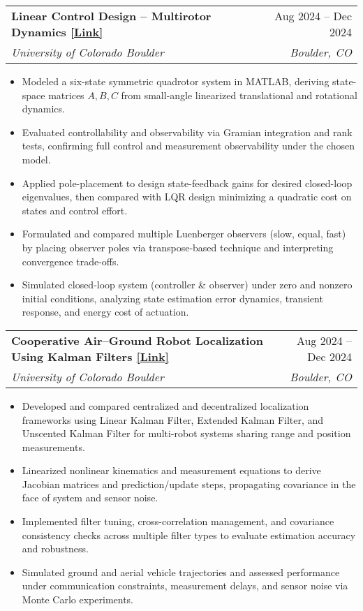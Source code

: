 \documentclass[a4paper,9pt]{article}
\makeatletter
\newcommand{\resumeItemWithoutTitle}[1]{
    \item\small{
        #1 \vspace{-2pt}
    }
}
\newcommand{\resumeSubheading}[4]{
    \vspace{-1pt}\item
        \begin{tabular*}{0.97\textwidth}{l@{\extracolsep{\fill}}r}
            \textbf{#1} & #2 \\
            \textit{#3} & \textit{#4} \\
        \end{tabular*}\vspace{-5pt}
}
\newcommand{\resumeItemListStart}{\begin{itemize}[leftmargin=*]}
\newcommand{\resumeItemListEnd}{\end{itemize}\vspace{-5pt}}
\makeatother
\begin{document}
\pagebreak

\resumeSubheading{Linear Control Design – Multirotor Dynamics \textcolor{blue}{\href{https://github.com/theanshuljain/linear-control-design-multirotor-dynamics}{[Link]}}}{Aug 2024 – Dec 2024}
{University of Colorado Boulder}{Boulder, CO}
\resumeItemListStart
\resumeItemWithoutTitle{Modeled a six-state symmetric quadrotor system in MATLAB, deriving state-space matrices \(A, B, C\) from small-angle linearized translational and rotational dynamics.}
\resumeItemWithoutTitle{Evaluated controllability and observability via Gramian integration and rank tests, confirming full control and measurement observability under the chosen model.}
\resumeItemWithoutTitle{Applied pole-placement to design state-feedback gains for desired closed-loop eigenvalues, then compared with LQR design minimizing a quadratic cost on states and control effort.}
\resumeItemWithoutTitle{Formulated and compared multiple Luenberger observers (slow, equal, fast) by placing observer poles via transpose-based technique and interpreting convergence trade-offs.}
\resumeItemWithoutTitle{Simulated closed-loop system (controller \& observer) under zero and nonzero initial conditions, analyzing state estimation error dynamics, transient response, and energy cost of actuation.}
\resumeItemListEnd

\resumeSubheading{Cooperative Air–Ground Robot Localization Using Kalman Filters \textcolor{blue}{\href{https://github.com/theanshuljain/cooperative-air-ground-robot-localization}{[Link]}}}{Aug 2024 – Dec 2024}
{University of Colorado Boulder}{Boulder, CO}
\resumeItemListStart
\resumeItemWithoutTitle{Developed and compared centralized and decentralized localization frameworks using Linear Kalman Filter, Extended Kalman Filter, and Unscented Kalman Filter for multi-robot systems sharing range and position measurements.}
\resumeItemWithoutTitle{Linearized nonlinear kinematics and measurement equations to derive Jacobian matrices and prediction/update steps, propagating covariance in the face of system and sensor noise.}
\resumeItemWithoutTitle{Implemented filter tuning, cross-correlation management, and covariance consistency checks across multiple filter types to evaluate estimation accuracy and robustness.}
\resumeItemWithoutTitle{Simulated ground and aerial vehicle trajectories and assessed performance under communication constraints, measurement delays, and sensor noise via Monte Carlo experiments.}
\resumeItemListEnd
\end{document}
